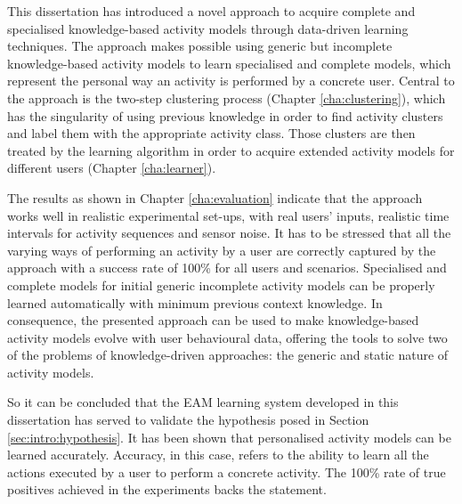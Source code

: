 This dissertation has introduced a novel approach to acquire complete and specialised knowledge-based activity models through data-driven learning techniques. The approach makes possible using generic but incomplete knowledge-based activity models to learn specialised and complete models, which represent the personal way an activity is performed by a concrete user. Central to the approach is the two-step clustering process (Chapter \ref{cha:clustering}), which has the singularity of using previous knowledge in order to find activity clusters and label them with the appropriate activity class. Those clusters are then treated by the learning algorithm in order to acquire extended activity models for different users (Chapter \ref{cha:learner}).

The results as shown in Chapter \ref{cha:evaluation} indicate that the approach works well in realistic experimental set-ups, with real users' inputs, realistic time intervals for activity sequences and sensor noise. It has to be stressed that all the varying ways of performing an activity by a user are correctly captured by the approach with a success rate of 100\% for all users and scenarios. Specialised and complete models for initial generic incomplete activity models can be properly learned automatically with minimum previous context knowledge. In consequence, the presented approach can be used to make knowledge-based activity models evolve with user behavioural data, offering the tools to solve two of the problems of knowledge-driven approaches: the generic and static nature of activity models.

So it can be concluded that the EAM learning system developed in this dissertation has served to validate the hypothesis posed in Section \ref{sec:intro:hypothesis}. It has been shown that personalised activity models can be learned accurately. Accuracy, in this case, refers to the ability to learn all the actions executed by a user to perform a concrete activity. The 100\% rate of true positives achieved in the experiments backs the statement.

